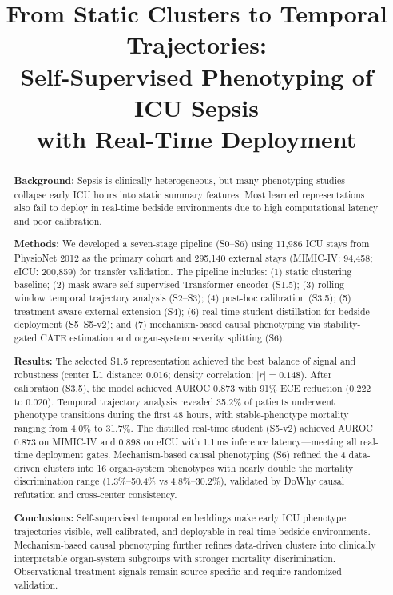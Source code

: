 \documentclass[conference,a4paper]{IEEEtran}
\title{From Static Clusters to Temporal Trajectories:\\Self-Supervised Phenotyping of ICU Sepsis\\with Real-Time Deployment}
\author{
\IEEEauthorblockN{Wang Ruike}
\IEEEauthorblockA{School of Biomedical Engineering, ShanghaiTech University}
}
\begin{document}
\maketitle

\begin{abstract}
\textbf{Background:} Sepsis is clinically heterogeneous, but many phenotyping studies collapse early ICU hours into static summary features. Most learned representations also fail to deploy in real-time bedside environments due to high computational latency and poor calibration.

\textbf{Methods:} We developed a seven-stage pipeline (S0--S6) using 11,986 ICU stays from PhysioNet 2012 as the primary cohort and 295,140 external stays (MIMIC-IV: 94,458; eICU: 200,859) for transfer validation. The pipeline includes: (1) static clustering baseline; (2) mask-aware self-supervised Transformer encoder (S1.5); (3) rolling-window temporal trajectory analysis (S2--S3); (4) post-hoc calibration (S3.5); (5) treatment-aware external extension (S4); (6) real-time student distillation for bedside deployment (S5--S5-v2); and (7) mechanism-based causal phenotyping via stability-gated CATE estimation and organ-system severity splitting (S6).

\textbf{Results:} The selected S1.5 representation achieved the best balance of signal and robustness (center L1 distance: 0.016; density correlation: $|r| = 0.148$). After calibration (S3.5), the model achieved AUROC 0.873 with 91\% ECE reduction (0.222 to 0.020). Temporal trajectory analysis revealed 35.2\% of patients underwent phenotype transitions during the first 48 hours, with stable-phenotype mortality ranging from 4.0\% to 31.7\%. The distilled real-time student (S5-v2) achieved AUROC 0.873 on MIMIC-IV and 0.898 on eICU with 1.1\,ms inference latency---meeting all real-time deployment gates. Mechanism-based causal phenotyping (S6) refined the 4 data-driven clusters into 16 organ-system phenotypes with nearly double the mortality discrimination range (1.3\%--50.4\% vs 4.8\%--30.2\%), validated by DoWhy causal refutation and cross-center consistency.

\textbf{Conclusions:} Self-supervised temporal embeddings make early ICU phenotype trajectories visible, well-calibrated, and deployable in real-time bedside environments. Mechanism-based causal phenotyping further refines data-driven clusters into clinically interpretable organ-system subgroups with stronger mortality discrimination. Observational treatment signals remain source-specific and require randomized validation.
\end{abstract}
\end{document}
